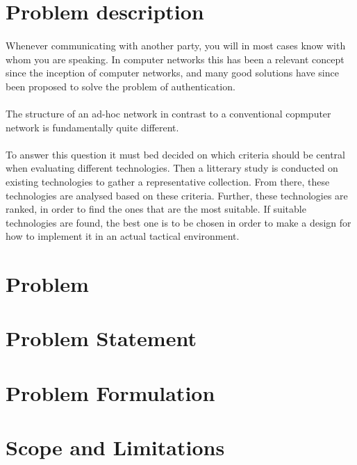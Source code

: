 \section{Problem description}
\paragraph{} Whenever communicating with another party, you will in most cases know with whom you are speaking. In computer networks this has been a relevant concept since the inception of computer  networks, and many good solutions have since been proposed to solve the problem of authentication.

\paragraph{} The structure of an ad-hoc network in contrast to a conventional copmputer network is fundamentally quite different. 

\paragraph{} To answer this question it must bed decided on which criteria should be central when evaluating different technologies. Then a litterary study is conducted on existing technologies to gather a representative collection. From there, these technologies are analysed based on these criteria. Further, these technologies are ranked, in order to find the ones that are the most suitable. If suitable technologies are found, the best one is to be chosen in order to make a design for how to implement it in an actual tactical environment.

\section{Problem}

\section{Problem Statement}

\section{Problem Formulation}

\section{Scope and Limitations}

